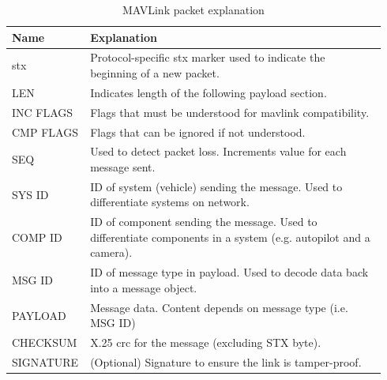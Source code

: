 \begin{table}[!h]
  \centering
  \begin{tabular}{ | >{\centering\arraybackslash}m{0.16\linewidth} | >{\centering\arraybackslash}m{0.78\linewidth} | }
    \hline
    \textbf{Name} & \textbf{Explanation} \\
    \hline
    \acs{stx} & Protocol\hyp{}specific \ac{stx} marker used to indicate the beginning of a new packet. \\
    \hline
    LEN & Indicates length of the following payload section. \\
    \hline
    INC FLAGS & Flags that must be understood for \acs{mavlink} compatibility. \\
    \hline
    CMP FLAGS & Flags that can be ignored if not understood. \\
    \hline
    SEQ & Used to detect packet loss. Increments value for each message sent. \\
    \hline
    SYS ID & ID of system (vehicle) sending the message. Used to differentiate systems on network. \\
    \hline
    COMP ID & ID of component sending the message. Used to differentiate components in a system (e.g. autopilot and a camera). \\
    \hline
    MSG ID & ID of message type in payload. Used to decode data back into a message object. \\
    \hline
    PAYLOAD & Message data. Content depends on message type (i.e. MSG ID) \\
    \hline
    CHECKSUM & X.25 \acs{crc} for the message (excluding STX byte). \\
    \hline
    SIGNATURE & (Optional) Signature to ensure the link is tamper\hyp{}proof. \\
    \hline
  \end{tabular}
  \caption{MAVLink packet explanation}
\end{table}